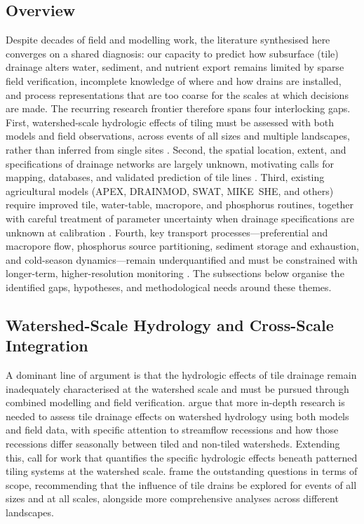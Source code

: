 \subsection{Overview}

Despite decades of field and modelling work, the literature synthesised here converges on a shared diagnosis: our capacity to predict how subsurface (tile) drainage alters water, sediment, and nutrient export remains limited by sparse field verification, incomplete knowledge of where and how drains are installed, and process representations that are too coarse for the scales at which decisions are made. The recurring research frontier therefore spans four interlocking gaps. First, watershed-scale hydrologic effects of tiling must be assessed with both models and field observations, across events of all sizes and multiple landscapes, rather than inferred from single sites \parencite{Schilling2008,Sloan2017,Sloan2016}. Second, the spatial location, extent, and specifications of drainage networks are largely unknown, motivating calls for mapping, databases, and validated prediction of tile lines \parencite{Naz2009,Zhou2025,Valayamkunnath2020}. Third, existing agricultural models (APEX, DRAINMOD, SWAT, MIKE~SHE, and others) require improved tile, water-table, macropore, and phosphorus routines, together with careful treatment of parameter uncertainty when drainage specifications are unknown at calibration \parencite{Williams2016,Bauwe2016,Guo2018b,Nelson2018}. Fourth, key transport processes---preferential and macropore flow, phosphorus source partitioning, sediment storage and exhaustion, and cold-season dynamics---remain underquantified and must be constrained with longer-term, higher-resolution monitoring \parencite{King2015,Grangeon2021,Trentman2020}. The subsections below organise the identified gaps, hypotheses, and methodological needs around these themes.

\subsection{Watershed-Scale Hydrology and Cross-Scale Integration}

A dominant line of argument is that the hydrologic effects of tile drainage remain inadequately characterised at the watershed scale and must be pursued through combined modelling and field verification. \textcite{Schilling2008} argue that more in-depth research is needed to assess tile drainage effects on watershed hydrology using both models and field data, with specific attention to streamflow recessions and how those recessions differ seasonally between tiled and non-tiled watersheds. Extending this, \textcite{Schilling2012} call for work that quantifies the specific hydrologic effects beneath patterned tiling systems at the watershed scale. \textcite{Sloan2017} frame the outstanding questions in terms of scope, recommending that the influence of tile drains be explored for events of all sizes and at all scales, alongside more comprehensive analyses across different landscapes.

